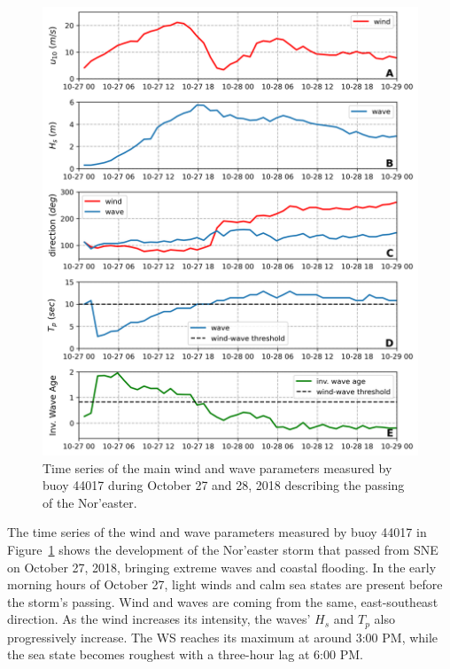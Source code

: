 \begin{figure}[H]
\centering
\includegraphics[width=0.75\linewidth]{Figures/Chapter5/noreaster_oct18_3days.png}
\caption{Time series of the main wind and wave parameters measured by buoy 44017 during October 27 and 28, 2018 describing the passing of the Nor'easter.}
\label{fig:noreaster_oct18_ts}
\end{figure}


The time series of the wind and wave parameters measured by buoy 44017 in Figure~\ref{fig:noreaster_oct18_ts} shows the development of the Nor'easter storm that passed from SNE on October 27, 2018, bringing extreme waves and coastal flooding. In the early morning hours of October 27, light winds and calm sea states are present before the storm's passing. Wind and waves are coming from the same, east-southeast direction. As the wind increases its intensity, the waves' $H_{s}$ and $T_{p}$ also progressively increase. The WS reaches its maximum at around 3:00 PM, while the sea state becomes roughest with a three-hour lag at 6:00 PM. 


